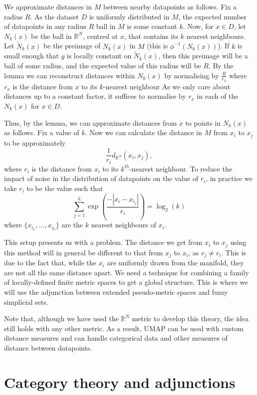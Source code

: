 \documentclass[a4paper,11pt,leqno]{article} \usepackage{amsmath}
\newcommand{\RR}{\mathbb{R}} \newcommand{\QQ}{\mathbb{Q}}
\theoremstyle{definition}
\begin{document}
We approximate distances in $M$ between nearby datapoints as follows.
Fix a radius $R$.
As the dataset $D$ is uniformly distributed in $M$, the expected number of
datapoints in any radius $R$ ball in $M$ is some constant $k$.
Now, for $x\in D$, let $N_k(x)$ be the ball in $\RR^N$, centred at $x$, that
contains its $k$ nearest neighbours.
Let $\tilde{N}_k(x)$ be the preimage of $N_k(x)$ in $M$ (this is $\phi^{-1}(N_k(x))$).
If $k$ is small enough that $g$ is locally constant on $\tilde{N}_k(x)$, then
this preimage will be a ball of some radius, and the expected value of this
radius will be $R$.
By the lemma we can reconstruct
distances within $N_k(x)$ by normalising by $\frac{R}{r_x}$ where $r_x$ is the
distance from $x$ to its $k$-nearest neighbour
As we only care about distances up to a constant factor, it suffices to
normalise by $r_x$ in each of the $N_k(x)$ for $x\in D$.

Thus, by the lemma, we can approximate distances from $x$ to points in $N_k(x)$
as follows.
Fix a value of $k$.
Now we can calculate the distance in $M$ from $x_i$ to $x_j$ to be
approximately
$$\frac{1}{r_i}d_{\RR^N}(x_i, x_j),$$
where $r_i$ is the distance from $x_i$ to its $k^{th}$-nearest neighbour.
To reduce the impact of noise in the distribution of datapoints on the value of
$r_i$, in practice we take $r_i$ to be the value such that
$$\sum_{j=1}^k\exp\left(\frac{-|x_i-x_{i_j}|}{r_i}\right) = \log_2(k)$$
where $\{x_{i_1},\ldots,x_{i_k}\}$ are the $k$ nearest neighbours of $x_i$.

This setup presents us with a problem.
The distance we get from $x_i$ to $x_j$ using this method will in general be
different to that from $x_j$ to $x_i$, as $r_j\not= r_i$.
This is due to the fact that, while the $x_i$ are uniformly drawn from the
manifold, they are not all the same distance apart.
We need a technique for combining a family of locally-defined finite metric
spaces to get a global structure.
This is where we will use the adjunction between extended pseudo-metric spaces
and fuzzy simplicial sets.

Note that, although we have used the $\RR^N$ metric to develop this theory, the
idea still holds with any other metric.
As a result, UMAP can be used with custom distance measures and can handle
categorical data and other measures of distance between datapoints.

\section{Category theory and adjunctions}
\end{document}
